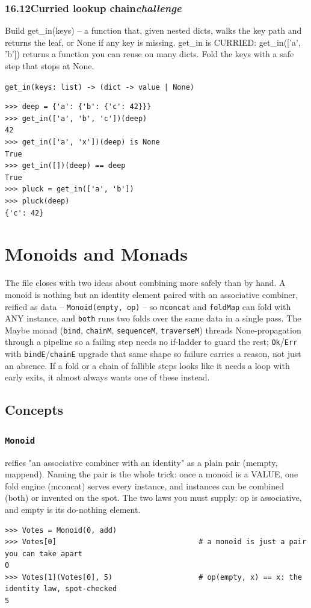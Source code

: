 \documentclass[10pt,letterpaper]{book}
\begin{document}
\subsection*{16.12\quad Curried lookup chain\hfill\textnormal{\textit{challenge}}}
Build get\_in(keys) -- a function that, given nested dicts, walks the key path and returns the leaf, or None if any key is missing. get\_in is CURRIED: get\_in(['a', 'b']) returns a function you can reuse on many dicts. Fold the keys with a safe step that stops at None.

\noindent\texttt{get\_in(keys: list) -> (dict -> value | None)}
\begin{lstlisting}[style=ex]
>>> deep = {'a': {'b': {'c': 42}}}
>>> get_in(['a', 'b', 'c'])(deep)
42
>>> get_in(['a', 'x'])(deep) is None
True
>>> get_in([])(deep) == deep
True
>>> pluck = get_in(['a', 'b'])
>>> pluck(deep)
{'c': 42}
\end{lstlisting}
\clearpage
\chapter{Monoids and Monads}

The file closes with two ideas about combining more safely than by hand. A
monoid is nothing but an identity element paired with an associative
combiner, reified as data -- \texttt{Monoid(empty, op)} -- so \texttt{mconcat}
and \texttt{foldMap} can fold with ANY instance, and \texttt{both} runs two
folds over the same data in a single pass. The Maybe monad
(\texttt{bind}, \texttt{chainM}, \texttt{sequenceM}, \texttt{traverseM})
threads None-propagation through a pipeline so a failing step needs no
if-ladder to guard the rest; \texttt{Ok}/\texttt{Err} with
\texttt{bindE}/\texttt{chainE} upgrade that same shape so failure carries a
reason, not just an absence. If a fold or a chain of fallible steps looks
like it needs a loop with early exits, it almost always wants one of
these instead.
\section{Concepts}
\subsection{\texttt{Monoid}}\label{def:Monoid}
reifies "an associative combiner with an identity" as a plain pair (mempty, mappend). Naming the pair is the whole trick: once a monoid is a VALUE, one fold engine (mconcat) serves every instance, and instances can be combined (both) or invented on the spot. The two laws you must supply: op is associative, and empty is its do-nothing element.
\begin{lstlisting}[style=ex]
>>> Votes = Monoid(0, add)
>>> Votes[0]                                 # a monoid is just a pair you can take apart
0
>>> Votes[1](Votes[0], 5)                    # op(empty, x) == x: the identity law, spot-checked
5
\end{lstlisting}
\end{document}
